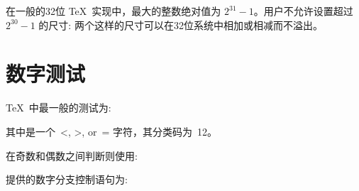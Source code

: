 \documentclass{book}
\begin{document}
在一般的32位 \TeX\ 实现中，最大的整数绝对值为 $2^{31}-1$。用户不允许设置超过 $2^{30}-1$ 的尺寸: 两个这样的尺寸可以在32位系统中相加或相减而不溢出。

\section{数字测试}

\TeX\ 中最一般的测试为:

\begin{disp}\end{disp}

其中是一个~\n<, \n>, or~\n= 字符，其分类码为~12。



在奇数和偶数之间判断则使用:

\begin{disp}\end{disp}


提供的数字分支控制语句为:

\begin{disp}%
     \end{disp}
\end{document}
